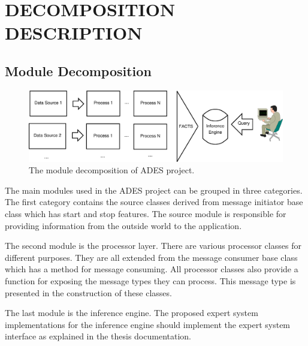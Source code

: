 \documentclass[a4paper,oneside,12pt]{report}
\begin{document}
\section{DECOMPOSITION DESCRIPTION}
\subsection{Module Decomposition}
\begin{figure}[ht]
\begin{center}
\includegraphics[width=140mm]{img/modulapp.eps}
\caption{The module decomposition of ADES project.}
\label{fig:modulapp}
\end{center}
\end{figure}

The main modules used in the ADES project can be grouped in three categories. The first category contains the source classes derived from message initiator base class which has start and stop features. The source module is responsible for providing information from the outside world to the application.

The second module is the processor layer. There are various processor classes for different purposes. They are all extended from the message consumer base class which has a method for message consuming. All processor classes also provide a function for exposing the message types they can process. This message type is presented in the construction of these classes.

The last module is the inference engine. The proposed expert system implementations for the inference engine should implement the expert system interface as explained in the thesis documentation. 
\end{document}
